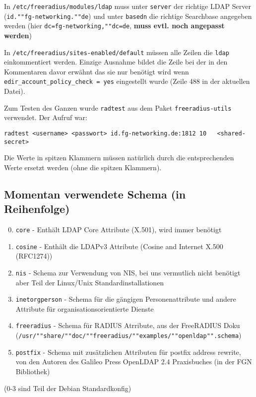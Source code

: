 \documentclass[11pt,a4paper,titlepage=firstiscover]{scrartcl} %
\begin{document}
In \texttt{/etc/freeradius/modules/ldap} muss unter \texttt{server} der richtige LDAP Server (\texttt{id.""fg-networking.""de}) und unter \texttt{basedn} die richtige Searchbase angegeben werden (hier \texttt{dc=fg-networking,""dc=de}, \textbf{muss evtl. noch angepasst werden})

In \texttt{/etc/freeradius/sites-enabled/default} müssen alle Zeilen die \texttt{ldap} einkommentiert werden. Einzige Ausnahme bildet die Zeile bei der in den Kommentaren davor erwähnt das sie nur benötigt wird wenn \texttt{edir\_account\_policy\_check = yes} eingestellt wurde (Zeile 488 in der aktuellen Datei).

Zum Testen des Ganzen wurde \texttt{radtest} aus dem Paket \texttt{freeradius-utils} verwendet. Der Aufruf war:
\begin{lstlisting}
radtest <username> <passwort> id.fg-networking.de:1812 10	<shared-secret>
\end{lstlisting}
Die Werte in spitzen Klammern müssen natürlich durch die entsprechenden Werte ersetzt werden (ohne die spitzen Klammern).


\subsection{Momentan verwendete Schema (in Reihenfolge)}
\begin{enumerate}
\setcounter{enumi}{-1}
\item \texttt{core} - Enthält LDAP Core Attribute (X.501), wird immer benötigt
\item \texttt{cosine} - Enthält die LDAPv3 Attribute (Cosine and Internet X.500 (RFC1274))
\item \texttt{nis} - Schema zur Verwendung von NIS, bei uns vermutlich nicht benötigt aber Teil der Linux/Unix Standardinstallationen
\item \texttt{inetorgperson} - Schema für die gängigen Personenattribute und andere Attribute für organisationsorientierte Dienste
\item \texttt{freeradius} - Schema für RADIUS Atrribute, aus der FreeRADIUS Doku (\texttt{/usr/""share/""doc/""freeradius/""examples/""openldap"".schema})
\item \texttt{postfix} - Schema mit zusätzlichen Attributen für postfix address rewrite, von den Autoren des Galileo Press OpenLDAP 2.4 Praxisbuches (in der FGN Bibliothek)
\end{enumerate}
(0-3 sind Teil der Debian Standardkonfig)
\end{document}
